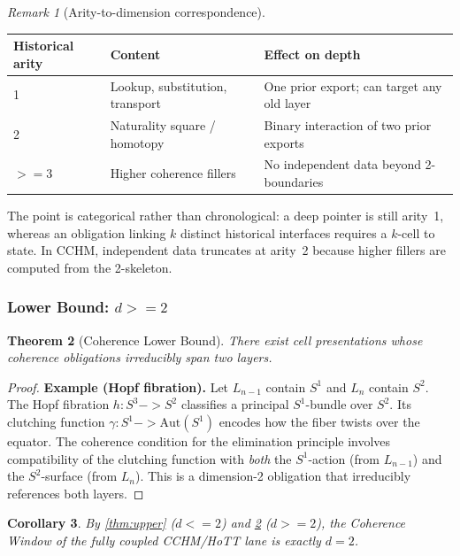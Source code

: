 \documentclass[11pt,a4paper]{article}
\def\leq{<=}%
\def\geq{>=}%
\def\to{->}%
\theoremstyle{plain}
\newtheorem{theorem}{Theorem}[section]
\newtheorem{corollary}[theorem]{Corollary}
\theoremstyle{definition}
\theoremstyle{remark}
\newtheorem{remark}[theorem]{Remark}
\begin{document}
\begin{remark}[Arity-to-dimension correspondence]
\label{rem:dim-temporal}
\begin{center}
\small
\begin{tabular}{lll}
\toprule
\textbf{Historical arity} & \textbf{Content} & \textbf{Effect on depth} \\
\midrule
1 & Lookup, substitution, transport & One prior export; can target any old layer \\
2 & Naturality square / homotopy & Binary interaction of two prior exports \\
$\geq 3$ & Higher coherence fillers & No independent data beyond 2-boundaries \\
\bottomrule
\end{tabular}
\end{center}
The point is categorical rather than chronological: a deep pointer is still arity~1, whereas an obligation linking $k$ distinct historical interfaces requires a $k$-cell to state.
In CCHM, independent data truncates at arity~2 because higher fillers are computed from the 2-skeleton.
\end{remark}

\subsubsection{\texorpdfstring{Lower Bound: $d \geq 2$}{Lower Bound: d >= 2}}

\begin{theorem}[Coherence Lower Bound]
\label{thm:lower}
There exist cell presentations whose coherence obligations irreducibly span two layers.
\end{theorem}

\begin{proof}
\textbf{Example (Hopf fibration).}
Let $L_{n-1}$ contain $S^1$ and $L_n$ contain $S^2$.
The Hopf fibration $h : S^3 \to S^2$ classifies a principal $S^1$-bundle over $S^2$.
Its clutching function $\gamma : S^1 \to \mathrm{Aut}(S^1)$ encodes how the fiber twists over the equator.
The coherence condition for the elimination principle involves compatibility of the clutching function with \emph{both} the $S^1$-action (from $L_{n-1}$) and the $S^2$-surface (from $L_n$).
This is a dimension-2 obligation that irreducibly references both layers.
\end{proof}

\begin{corollary}
By \cref{thm:upper} ($d \leq 2$) and \cref{thm:lower} ($d \geq 2$), the Coherence Window of the fully coupled CCHM/HoTT lane is exactly $d = 2$.
\end{corollary}
\end{document}
